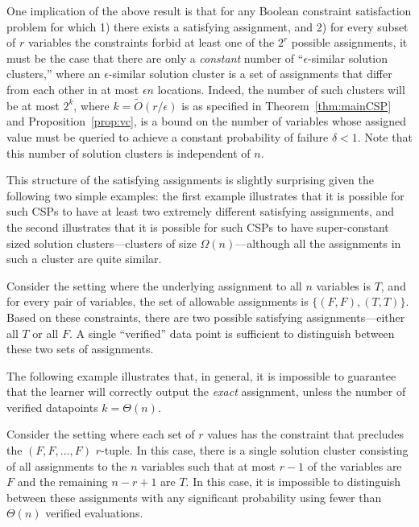 \documentclass[anon,12pt]{colt2018}
\newcommand{\eps}{\epsilon}
\begin{document}
One implication of the above result is that for any Boolean constraint satisfaction problem for which 1) there exists a satisfying assignment, and 2) for every subset of $r$ variables the constraints forbid at least one of the $2^r$ possible assignments, it  must be the case that there are only a \emph{constant} number of ``$\eps$-similar solution clusters,'' where an $\eps$-similar solution cluster is a set of assignments that differ from each other in at most $\eps n$ locations.  Indeed, the number of such clusters will be at most $2^k$, where $k = \tilde{O}(r/\eps)$ is as specified in Theorem~\ref{thm:mainCSP} and Proposition~\ref{prop:vc}, is a bound on the number of variables whose assigned value must be queried to achieve a constant probability of failure $\delta < 1$.   Note that this number of solution clusters is independent of $n$.  

This structure of the satisfying assignments is slightly surprising given the following two simple examples: the first example illustrates that it is possible for such CSPs to have at least two extremely different satisfying assignments, and the second illustrates that it is possible for such CSPs to have super-constant sized solution clusters---clusters of size $\Omega(n)$---although all the assignments in such a cluster are quite similar. 

\begin{example}
Consider the setting where the underlying assignment to all $n$ variables is $T$, and for every pair of variables, the set of allowable assignments is $\{(F,F), (T,T)\}$.  Based on these constraints, there are two possible satisfying assignments---either all $T$ or all $F$.    A single ``verified'' data point is sufficient to distinguish between these two sets of assignments.
\end{example}

The following example illustrates that, in general, it is impossible to guarantee that the learner will correctly output the \emph{exact} assignment, unless the number of verified datapoints $k = \Theta(n)$.
\begin{example}
Consider the setting where each set of $r$ values has the constraint that precludes the $(F,F,\ldots,F)$ $r$-tuple.  In this case, there is a single solution cluster consisting of all assignments to the $n$ variables such that at most $r-1$ of the variables are $F$ and the remaining $n-r+1$ are $T$.  In this case, it is impossible to distinguish between these assignments with any significant probability using fewer than  $\Theta(n)$ verified evaluations.
\end{example} 
\end{document}
